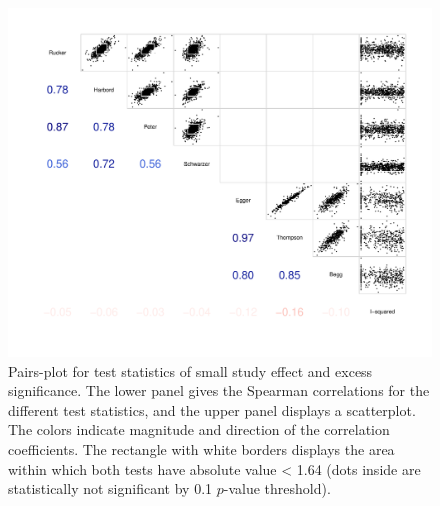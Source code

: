 \documentclass[11pt,a4paper,twoside]{book}\usepackage[]{graphicx}\usepackage[]{color}
\newenvironment{knitrout}{}{} %
\begin{document}
\begin{figure}
\begin{knitrout}
\color{fgcolor}

{\centering \includegraphics[width=\textwidth-3cm]{figure/ch03_figunnamed-chunk-15-1} 

}



\end{knitrout}
\caption{Pairs-plot for test statistics of small study effect and excess significance. The lower panel gives the Spearman correlations for the different test statistics, and the upper panel displays a scatterplot. The colors indicate magnitude and direction of the correlation coefficients. The rectangle with white borders displays the area within which both tests have absolute value < 1.64 (dots inside are statistically not significant by 0.1 $p$-value threshold).}
\label{fig:test.agreement}
\end{figure}
\end{document}
